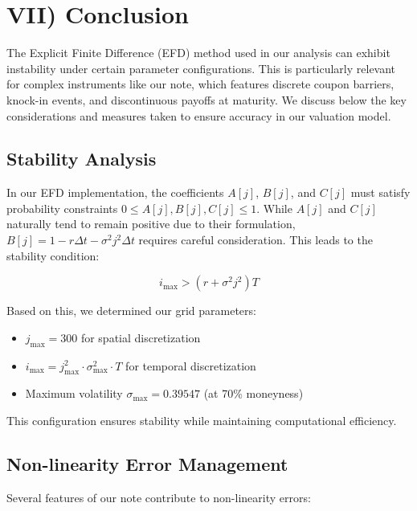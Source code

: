 \documentclass[12pt,a4paper]{article}
\begin{document}
\section*{VII) Conclusion}

The Explicit Finite Difference (EFD) method used in our analysis can exhibit instability under certain parameter configurations. This is particularly relevant for complex instruments like our note, which features discrete coupon barriers, knock-in events, and discontinuous payoffs at maturity. We discuss below the key considerations and measures taken to ensure accuracy in our valuation model.

\subsection*{Stability Analysis}

In our EFD implementation, the coefficients \(A[j]\), \(B[j]\), and \(C[j]\) must satisfy probability constraints \(0 \leq A[j], B[j], C[j] \leq 1\). While \(A[j]\) and \(C[j]\) naturally tend to remain positive due to their formulation, \(B[j] = 1 - r\Delta t - \sigma^2j^2\Delta t\) requires careful consideration. This leads to the stability condition:

\[
    i_{\text{max}} > (r + \sigma^2j^2)T
\]

Based on this, we determined our grid parameters:
\begin{itemize}
\item \(j_{\text{max}} = 300\) for spatial discretization
\item \(i_{\text{max}} = j_{\text{max}}^2 \cdot \sigma_{\text{max}}^2 \cdot T\) for temporal discretization
\item Maximum volatility \(\sigma_{\text{max}} = 0.39547\) (at 70\% moneyness)
\end{itemize}

This configuration ensures stability while maintaining computational efficiency.

\subsection*{Non-linearity Error Management}

Several features of our note contribute to non-linearity errors:
\end{document}
